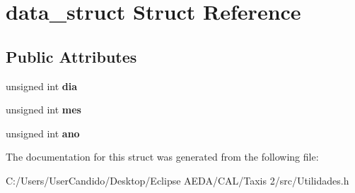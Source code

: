 \hypertarget{structdata__struct}{}\section{data\+\_\+struct Struct Reference}
\label{structdata__struct}
\subsection*{Public Attributes}
\begin{DoxyCompactItemize}
\item 
\hypertarget{structdata__struct_a17a70fb8ce7ea58aff3b0ba60b7f5e5b}{}\label{structdata__struct_a17a70fb8ce7ea58aff3b0ba60b7f5e5b} 
unsigned int {\bfseries dia}
\item 
\hypertarget{structdata__struct_a07c99afd664b3c1d36462e87201f2a89}{}\label{structdata__struct_a07c99afd664b3c1d36462e87201f2a89} 
unsigned int {\bfseries mes}
\item 
\hypertarget{structdata__struct_a1d3ed5c9543d622a7ed8785f8007f8f9}{}\label{structdata__struct_a1d3ed5c9543d622a7ed8785f8007f8f9} 
unsigned int {\bfseries ano}
\end{DoxyCompactItemize}


The documentation for this struct was generated from the following file\+:\begin{DoxyCompactItemize}
\item 
C\+:/\+Users/\+User\+Candido/\+Desktop/\+Eclipse A\+E\+D\+A/\+C\+A\+L/\+Taxis 2/src/Utilidades.\+h\end{DoxyCompactItemize}
